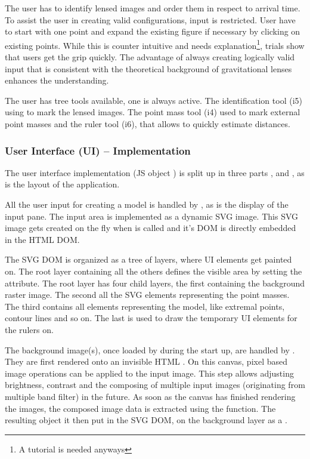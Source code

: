 The user has to identify lensed images and order them in respect to arrival time.
To assist the user in creating valid configurations, input is restricted.
User have to start with one point and expand the existing figure if necessary by clicking on existing points.
While this is counter intuitive and needs explanation\footnote{A tutorial is needed anyways}, trials show that users get the grip quickly.
The advantage of always creating logically valid input that is consistent with the theoretical background of gravitational lenses enhances the understanding.

The user has tree tools available, one is always active.
The identification tool (i5) using to mark the lensed images.
The point mass tool (i4) used to mark external point masses and the ruler tool (i6), that allows to quickly estimate distances.



\subsubsection{User Interface (UI) -- Implementation}
\label{sec:ui-impl}

The user interface implementation (JS object ) is split up in three parts ,  and , as is the layout of the application.

All the user input for creating a model is handled by , as is the display of the input pane.
The input area is implemented as a dynamic SVG image. This SVG image gets created on the fly when  is called and it's DOM is directly embedded in the HTML DOM.

The SVG DOM is organized as a tree of layers, where UI elements get painted on.
The root layer containing all the others defines the visible area by setting the  attribute.
The root layer has four child layers, the first containing the background raster image.
The second all the SVG elements representing the point masses.
The third contains all elements representing the model, like extremal points, contour lines and so on.
The last is used to draw the temporary UI elements for the rulers on.

The background image(s), once loaded by  during the start up, are handled by .
They are first rendered onto an invisible HTML .
On this canvas, pixel based image operations can be applied to the input image.
This step allows adjusting brightness, contrast and the composing of multiple input images (originating from multiple band filter) in the future.
As soon as the canvas has finished rendering the images, the composed image data is extracted using the  function.
The resulting object it then put in the SVG DOM, on the background layer as a .

